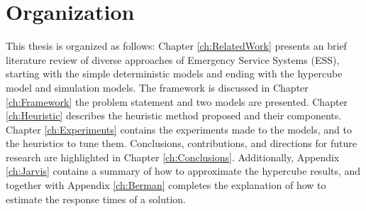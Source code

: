 \section{Organization}
This thesis is organized as follows:
Chapter \ref{ch:RelatedWork}
presents an brief literature review
of diverse approaches of Emergency Service Systems (ESS),
starting with the simple deterministic models
and ending with the hypercube model and simulation models.
The framework is discussed in Chapter \ref{ch:Framework}
the problem statement and two models are presented.
Chapter \ref{ch:Heuristic} describes the heuristic method proposed
and their components.
Chapter \ref{ch:Experiments} contains
the experiments made to the models,
and to the heuristics to tune them.
Conclusions, contributions, 
and directions for future research
are highlighted in Chapter \ref{ch:Conclusions}.
Additionally, Appendix \ref{ch:Jarvis}
contains a summary of how to approximate the hypercube results,
and together with Appendix \ref{ch:Berman}
completes the explanation of how to estimate
the response times of a solution.
